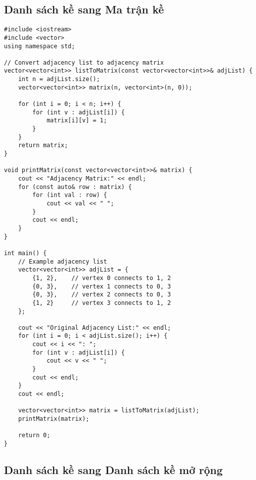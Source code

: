 \documentclass[12pt]{article}
\begin{document}
\subsection{Danh sách kề sang Ma trận kề}

\begin{lstlisting}[caption={Chuyển đổi từ Danh sách kề sang Ma trận kề}]
#include <iostream>
#include <vector>
using namespace std;

// Convert adjacency list to adjacency matrix
vector<vector<int>> listToMatrix(const vector<vector<int>>& adjList) {
    int n = adjList.size();
    vector<vector<int>> matrix(n, vector<int>(n, 0));
    
    for (int i = 0; i < n; i++) {
        for (int v : adjList[i]) {
            matrix[i][v] = 1;
        }
    }
    return matrix;
}

void printMatrix(const vector<vector<int>>& matrix) {
    cout << "Adjacency Matrix:" << endl;
    for (const auto& row : matrix) {
        for (int val : row) {
            cout << val << " ";
        }
        cout << endl;
    }
}

int main() {
    // Example adjacency list
    vector<vector<int>> adjList = {
        {1, 2},    // vertex 0 connects to 1, 2
        {0, 3},    // vertex 1 connects to 0, 3
        {0, 3},    // vertex 2 connects to 0, 3
        {1, 2}     // vertex 3 connects to 1, 2
    };
    
    cout << "Original Adjacency List:" << endl;
    for (int i = 0; i < adjList.size(); i++) {
        cout << i << ": ";
        for (int v : adjList[i]) {
            cout << v << " ";
        }
        cout << endl;
    }
    cout << endl;
    
    vector<vector<int>> matrix = listToMatrix(adjList);
    printMatrix(matrix);
    
    return 0;
}
\end{lstlisting}

\subsection{Danh sách kề sang Danh sách kề mở rộng}
\end{document}
